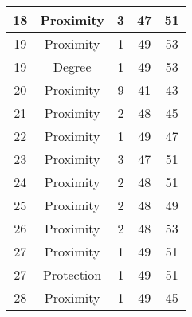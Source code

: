 \documentclass[results.tex]{subfiles}
\begin{document}
\begin{center}
\begin{tabular}{| c || c | c | c | c |}
            \hline
            18                      & Proximity                    & 3                      & 47                      & 51                   \\
            \hline
            19                      & Proximity                    & 1                      & 49                      & 53                   \\
            \hline
            19                      & Degree                       & 1                      & 49                      & 53                   \\
            \hline
            20                      & Proximity                    & 9                      & 41                      & 43                   \\
            \hline
            21                      & Proximity                    & 2                      & 48                      & 45                   \\
            \hline
            22                      & Proximity                    & 1                      & 49                      & 47                   \\
            \hline
            23                      & Proximity                    & 3                      & 47                      & 51                   \\
            \hline
            24                      & Proximity                    & 2                      & 48                      & 51                   \\
            \hline
            25                      & Proximity                    & 2                      & 48                      & 49                   \\
            \hline
            26                      & Proximity                    & 2                      & 48                      & 53                   \\
            \hline
            27                      & Proximity                    & 1                      & 49                      & 51                   \\
            \hline
            27                      & Protection                   & 1                      & 49                      & 51                   \\
            \hline
            28                      & Proximity                    & 1                      & 49                      & 45                   \\

\end{tabular}
\end{center}
\end{document}
